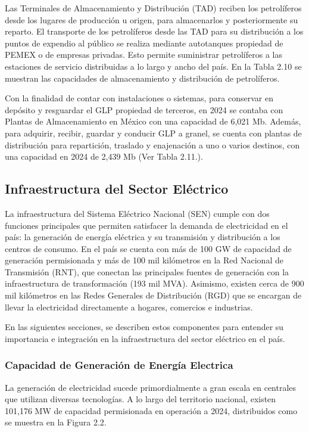 \documentclass{sener2025}
\begin{document}
Las Terminales de Almacenamiento y Distribución (TAD) reciben los petrolíferos desde los lugares de producción u origen, para almacenarlos y posteriormente su reparto. El transporte de los petrolíferos desde las TAD para su distribución a los puntos de expendio al público se realiza mediante autotanques propiedad de PEMEX o de empresas privadas. Esto permite suministrar petrolíferos a las estaciones de servicio distribuidas a lo largo y ancho del país. En la Tabla 2.10 se muestran las capacidades de almacenamiento y distribución de petrolíferos.

Con la finalidad de contar con instalaciones o sistemas, para conservar en depósito y resguardar el GLP propiedad de terceros, en 2024 se contaba con Plantas de Almacenamiento en México con una capacidad de 6,021 Mb. Además, para adquirir, recibir, guardar y conducir GLP a granel, se cuenta con plantas de distribución para repartición, traslado y enajenación a uno o varios destinos, con una capacidad en 2024 de 2,439 Mb (Ver Tabla 2.11.).


\subsection{Infraestructura del Sector Eléctrico}

La infraestructura del Sistema Eléctrico Nacional (SEN) cumple con dos funciones principales que permiten satisfacer la demanda de electricidad en el país: la generación de energía eléctrica y su transmisión y distribución a los centros de consumo. En el país se cuenta con más de 100 GW de capacidad de generación permisionada y más de 100 mil kilómetros en la Red Nacional de Transmisión (RNT), que conectan las principales fuentes de generación con la infraestructura de transformación (193 mil MVA). Asimismo, existen cerca de 900 mil kilómetros en las Redes Generales de Distribución (RGD) que se encargan de llevar la electricidad directamente a hogares, comercios e industrias.

En las siguientes secciones, se describen estos componentes para entender su importancia e integración en la infraestructura del sector eléctrico en el país.


\subsubsection{Capacidad de Generación de Energía Electrica}

La generación de electricidad sucede primordialmente a gran escala en centrales que utilizan diversas tecnologías. A lo largo del territorio nacional, existen 101,176 MW de capacidad permisionada en operación a 2024, distribuidos como se muestra en la Figura 2.2.
\end{document}
